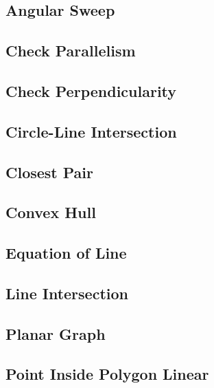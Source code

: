 \subsection{Angular Sweep}
\raggedbottom
\hrulefill
\subsection{Check Parallelism}
\raggedbottom
\hrulefill
\subsection{Check Perpendicularity}
\raggedbottom
\hrulefill
\subsection{Circle-Line Intersection}
\raggedbottom
\hrulefill
\subsection{Closest Pair}
\raggedbottom
\hrulefill
\subsection{Convex Hull}
\raggedbottom
\hrulefill
\subsection{Equation of Line}
\raggedbottom
\hrulefill
\subsection{Line Intersection}
\raggedbottom
\hrulefill
\subsection{Planar Graph}
\raggedbottom
\hrulefill
\subsection{Point Inside Polygon Linear}
\raggedbottom
\hrulefill
